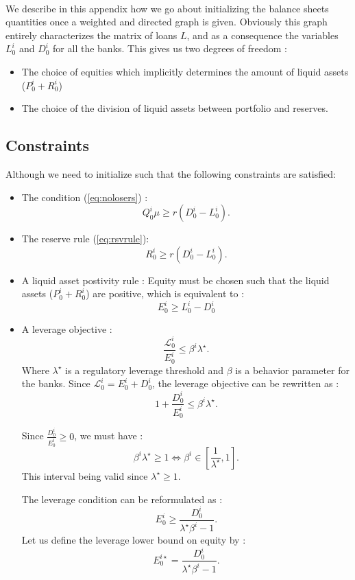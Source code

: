 \documentclass{article}
\begin{document}
\begin{appendices}
\paragraph{}
We describe in this appendix how we go about initializing the balance sheets quantities once a weighted and directed graph is given. Obviously this graph entirely characterizes the matrix of loans $L$, and as a consequence the variables $L_0^i$ and $D_0^i$ for all the banks. This gives us two degrees of freedom : 

\begin{itemize}
\item The choice of equities which implicitly determines the amount of liquid assets ($P_0^i + R_0^i$)
\item The choice of the division of liquid assets between portfolio and reserves.
\end{itemize}

\subsection{Constraints}

Although we need to initialize such that the following constraints are satisfied:
\begin{itemize}
\item The condition (\ref{eq:nolosers}) : $$Q_0^{i} \mu \geq r(D_0^i - L_0^i).$$
\item The reserve rule (\ref{eq:rsvrule}): $$R_0^i \geq r(D_0^i - L_0^i).$$

\item A liquid asset postivity rule : Equity must be chosen such that the liquid assets ($P_0^i + R_0^i$) are positive, which is equivalent to : 
$$E_0^i \geq L_0^i - D_0^i $$
\item A leverage objective : $$ \frac{\mathcal{L}_0^i}{E_0^i} \leq \beta^i \lambda^{\star}.$$ Where $\lambda^{\star}$ is a regulatory leverage threshold and $\beta$ is a behavior parameter for the banks.
Since $\mathcal{L}_0^i = E_0^i + D_0^i$, the leverage objective can be rewritten as : 
$$ 1 + \frac{D_0^i}{E_0^i} \leq \beta^i \lambda^{\star}.$$

Since $\frac{D_0^i}{E_0^i} \geq 0$, we must have :
$$\beta^i \lambda^{\star} \geq 1 \Leftrightarrow \beta^i \in [\frac{1}{\lambda^{\star}}, 1 ].$$
This interval being valid since $\lambda^{\star} \geq 1.$

The leverage condition can be reformulated as : 
$$ E_0^i \geq \frac{D_0^i}{\lambda^{\star}\beta^i - 1}.$$
Let us define the leverage lower bound on equity by : 
$$ E_0^{i \star} = \frac{D_0^i}{\lambda^{\star}\beta^i - 1}.$$ 
\end{itemize}




\end{appendices}
\end{document}
